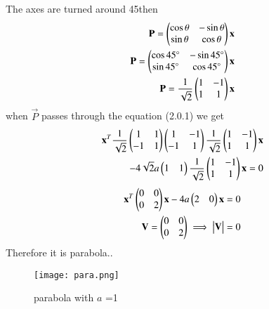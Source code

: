 \documentclass[journal,12pt,twocolumn]{IEEEtran}
\begin{document}
The axes are turned around 45\degree then 
\begin{align}
    \mathbf{P}=\begin{pmatrix}\cos\theta & -\sin\theta \\ \sin\theta & \cos\theta\end{pmatrix}\mathbf{x}\\
    \mathbf{P}=\begin{pmatrix}\cos45\degree & -\sin45\degree \\ \sin45\degree & \cos45\degree\end{pmatrix}\mathbf{x}\\
    \mathbf{P} = \frac{1}{\sqrt{2}}\begin{pmatrix}1&-1\\1&1\end{pmatrix}\mathbf{x}
\end{align}
when $\vec{P}$ passes through the equation (2.0.1) we get
\begin{multline}
\begin{aligned}
\mathbf{x}^T\frac{1}{\sqrt{2}}\begin{pmatrix}1&1\\-1&1\end{pmatrix}\begin{pmatrix}1&-1\\-1&1\end{pmatrix}\frac{1}{\sqrt{2}}\begin{pmatrix}1&-1\\1&1\end{pmatrix}\mathbf{x}\\-4\sqrt{2}a\begin{pmatrix}1&1\end{pmatrix}\frac{1}{\sqrt{2}}\begin{pmatrix}1&-1\\1&1\end{pmatrix}\mathbf{x}=0
\end{aligned}
\end{multline}
\begin{align}
    \mathbf{x}^T\begin{pmatrix}0&0\\0&2\end{pmatrix}\mathbf{x}-4a\begin{pmatrix}2&0\end{pmatrix}\mathbf{x}=0\\
    \mathbf{V}=\begin{pmatrix}0&0\\0&2\end{pmatrix}\implies\begin{vmatrix}\mathbf{V}\end{vmatrix}=0
\end{align}
Therefore it is parabola..
\begin{figure}[!ht]
\centering
\texttt{[image: para.png]}
\caption{ parabola with $a$ =1}
\label{Fig}
\end{figure}
\end{document}
